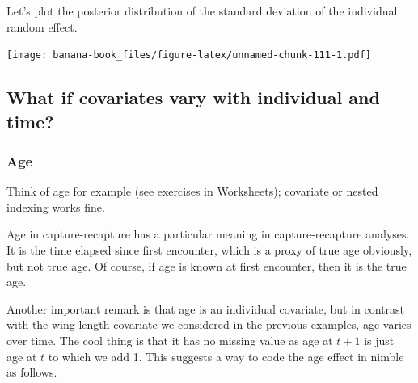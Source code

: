 \documentclass[
  12pt,
]{krantz}
\newenvironment{Shaded}{\begin{snugshade}}{\end{snugshade}}
\newcommand{\AttributeTok}[1]{\textcolor[rgb]{0.13,0.29,0.53}{#1}}
\newcommand{\DecValTok}[1]{\textcolor[rgb]{0.00,0.00,0.81}{#1}}
\newcommand{\FunctionTok}[1]{\textcolor[rgb]{0.13,0.29,0.53}{\textbf{#1}}}
\newcommand{\NormalTok}[1]{#1}
\newcommand{\OtherTok}[1]{\textcolor[rgb]{0.56,0.35,0.01}{#1}}
\newcommand{\SpecialCharTok}[1]{\textcolor[rgb]{0.81,0.36,0.00}{\textbf{#1}}}
\newcommand{\StringTok}[1]{\textcolor[rgb]{0.31,0.60,0.02}{#1}}
\begin{document}
Let's plot the posterior distribution of the standard deviation of the individual random effect.

\begin{Shaded}
\end{Shaded}

\texttt{[image: banana-book\_files/figure-latex/unnamed-chunk-111-1.pdf]}

\hypertarget{what-if-covariates-vary-with-individual-and-time}{%
\subsection{What if covariates vary with individual and time?}\label{what-if-covariates-vary-with-individual-and-time}}

\hypertarget{age}{%
\subsubsection{Age}\label{age}}

Think of age for example (see exercises in Worksheets); covariate or nested indexing works fine.

Age in capture-recapture has a particular meaning in capture-recapture analyses. It is the time elapsed since first encounter, which is a proxy of true age obviously, but not true age. Of course, if age is known at first encounter, then it is the true age.

Another important remark is that age is an individual covariate, but in contrast with the wing length covariate we considered in the previous examples, age varies over time. The cool thing is that it has no missing value as age at \(t+1\) is just age at \(t\) to which we add 1. This suggests a way to code the age effect in nimble as follows.
\end{document}
